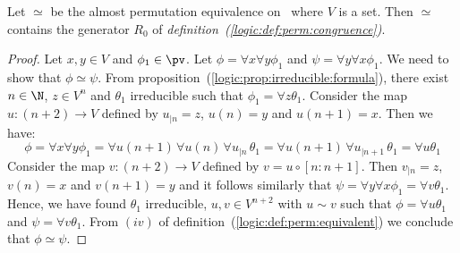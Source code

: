 \begin{prop}\label{logic:prop:perm:contains:r0}
Let $\simeq$ be the almost permutation equivalence on \pv\ where $V$
is a set. Then $\simeq$ contains the generator $R_{0}$ of {\em
definition~(\ref{logic:def:perm:congruence})}.
\end{prop}
\begin{proof}
Let $x,y\in V$ and $\phi_{1}\in\pv$. Let $\phi=\forall x\forall
y\phi_{1}$ and $\psi=\forall y\forall x\phi_{1}$. We need to show
that $\phi\simeq\psi$. From
proposition~(\ref{logic:prop:irreducible:formula}), there exist
$n\in\N$,  $z\in V^{n}$ and $\theta_{1}$ irreducible such that
$\phi_{1}=\forall z\theta_{1}$. Consider the map $u:(n+2)\to V$
defined by $u_{|n}=z$, $u(n)=y$ and $u(n+1)=x$. Then we have:
    \[
    \phi=\forall x\forall y\phi_{1}=\forall u(n+1)\,\forall
    u(n)\,\forall u_{|n}\,\theta_{1}
    =\forall u(n+1)\,\forall u_{|n+1}\,\theta_{1}=\forall u\theta_{1}
    \]
Consider the map $v:(n+2)\to V$ defined by $v=u\circ[n:n+1]$. Then
$v_{|n}=z$, $v(n)=x$ and $v(n+1)=y$ and it follows similarly that
$\psi=\forall y\forall x\phi_{1}=\forall v\theta_{1}$. Hence, we
have found $\theta_{1}$ irreducible, $u,v\in V^{n+2}$ with $u\sim v$
such that $\phi=\forall u\theta_{1}$ and $\psi=\forall v\theta_{1}$.
From $(iv)$ of definition~(\ref{logic:def:perm:equivalent}) we
conclude that $\phi\simeq\psi$.
\end{proof}

